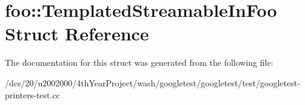 \hypertarget{structfoo_1_1TemplatedStreamableInFoo}{}\section{foo\+:\+:Templated\+Streamable\+In\+Foo Struct Reference}
\label{structfoo_1_1TemplatedStreamableInFoo}


The documentation for this struct was generated from the following file\+:\begin{DoxyCompactItemize}
\item 
/dcs/20/u2002000/4th\+Year\+Project/wash/googletest/googletest/test/googletest-\/printers-\/test.\+cc\end{DoxyCompactItemize}
